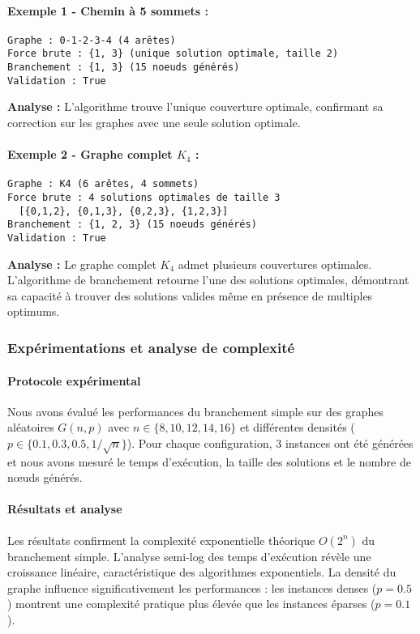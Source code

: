 \documentclass[11pt,a4paper]{article}
\begin{document}
\paragraph{Exemple 1 - Chemin à 5 sommets :}
\begin{verbatim}
Graphe : 0-1-2-3-4 (4 arêtes)
Force brute : {1, 3} (unique solution optimale, taille 2)
Branchement : {1, 3} (15 noeuds générés)
Validation : True
\end{verbatim}
\textbf{Analyse :} L'algorithme trouve l'unique couverture optimale, confirmant sa correction sur les graphes avec une seule solution optimale.

\paragraph{Exemple 2 - Graphe complet $K_4$ :}
\begin{verbatim}
Graphe : K4 (6 arêtes, 4 sommets)
Force brute : 4 solutions optimales de taille 3
  [{0,1,2}, {0,1,3}, {0,2,3}, {1,2,3}]
Branchement : {1, 2, 3} (15 noeuds générés)  
Validation : True
\end{verbatim}
\textbf{Analyse :} Le graphe complet $K_4$ admet plusieurs couvertures optimales. L'algorithme de branchement retourne l'une des solutions optimales, démontrant sa capacité à trouver des solutions valides même en présence de multiples optimums.

\subsubsection{Expérimentations et analyse de complexité}

\paragraph{Protocole expérimental}
Nous avons évalué les performances du branchement simple sur des graphes aléatoires $G(n,p)$ avec $n \in \{8,10,12,14,16\}$ et différentes densités ($p \in \{0.1,0.3,0.5,1/\sqrt{n}\}$). Pour chaque configuration, 3 instances ont été générées et nous avons mesuré le temps d'exécution, la taille des solutions et le nombre de nœuds générés.

\paragraph{Résultats et analyse}
Les résultats confirment la complexité exponentielle théorique $O(2^n)$ du branchement simple. L'analyse semi-log des temps d'exécution révèle une croissance linéaire, caractéristique des algorithmes exponentiels. La densité du graphe influence significativement les performances : les instances denses ($p=0.5$) montrent une complexité pratique plus élevée que les instances éparses ($p=0.1$).
\end{document}
